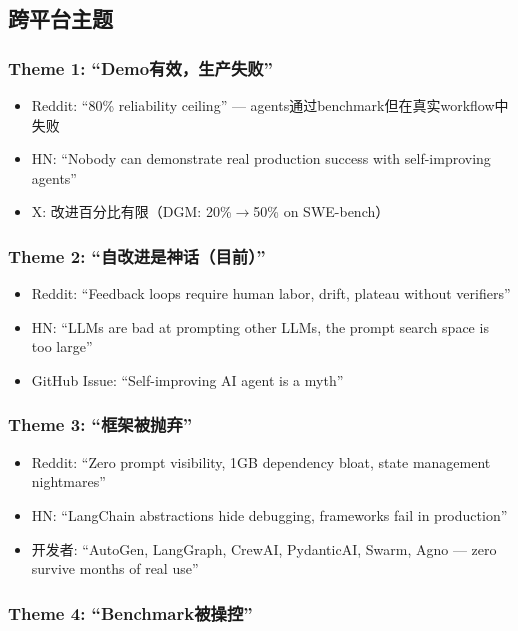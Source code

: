 \subsection{跨平台主题}

\subsubsection{Theme 1: ``Demo有效，生产失败''}

\begin{itemize}[nosep]
\item Reddit: ``80\% reliability ceiling'' — agents通过benchmark但在真实workflow中失败
\item HN: ``Nobody can demonstrate real production success with self-improving agents''
\item X: 改进百分比有限（DGM: 20\%$\to$50\% on SWE-bench）
\end{itemize}

\subsubsection{Theme 2: ``自改进是神话（目前）''}

\begin{itemize}[nosep]
\item Reddit: ``Feedback loops require human labor, drift, plateau without verifiers''
\item HN: ``LLMs are bad at prompting other LLMs, the prompt search space is too large''
\item GitHub Issue: ``Self-improving AI agent is a myth''
\end{itemize}

\subsubsection{Theme 3: ``框架被抛弃''}

\begin{itemize}[nosep]
\item Reddit: ``Zero prompt visibility, 1GB dependency bloat, state management nightmares''
\item HN: ``LangChain abstractions hide debugging, frameworks fail in production''
\item 开发者: ``AutoGen, LangGraph, CrewAI, PydanticAI, Swarm, Agno — zero survive months of real use''
\end{itemize}

\subsubsection{Theme 4: ``Benchmark被操控''}

